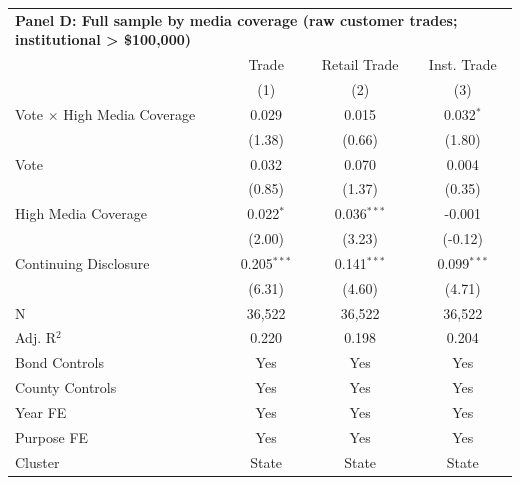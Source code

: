 \begingroup
\centering
\begin{tabular*}{\textwidth}{@{\extracolsep{\fill}}lccc}
\multicolumn{5}{l}{\textbf{Panel D: Full sample by media coverage (raw customer trades; institutional > \$100,000)}}\\

\addlinespace
   \toprule
                                      & Trade         & Retail Trade  & Inst. Trade\\  
                                      & (1)           & (2)           & (3)\\  
   \midrule 
   Vote $\times$ High Media Coverage  & 0.029         & 0.015         & 0.032$^{*}$\\   
                                      & (1.38)       & (0.66)       & (1.80)\\   
   Vote                               & 0.032         & 0.070         & 0.004\\   
                                      & (0.85)       & (1.37)       & (0.35)\\   
   High Media Coverage                & 0.022$^{*}$   & 0.036$^{***}$ & -0.001\\   
                                      & (2.00)       & (3.23)       & (-0.12)\\   
   Continuing Disclosure              & 0.205$^{***}$ & 0.141$^{***}$ & 0.099$^{***}$\\   
                                      & (6.31)       & (4.60)       & (4.71)\\   
   \hline
   N                       & 36,522        & 36,522        & 36,522\\  
   Adj. R$^2$                     & 0.220         & 0.198         & 0.204\\  
   Bond Controls                      & Yes           & Yes           & Yes\\  
   County Controls                    & Yes           & Yes           & Yes\\  
   Year FE                            & Yes           & Yes           & Yes\\  
   Purpose FE                         & Yes           & Yes           & Yes\\  
   Cluster              & State & State & State\\  
   \bottomrule
\end{tabular*}
\par\endgroup
